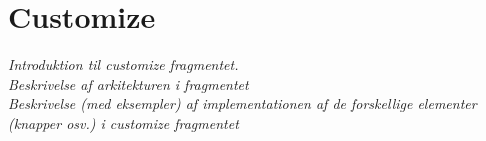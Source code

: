 \section{Customize}
\textit{Introduktion til customize fragmentet.\\
Beskrivelse af arkitekturen i fragmentet\\
Beskrivelse (med eksempler) af implementationen af de forskellige elementer (knapper osv.) i customize fragmentet}

